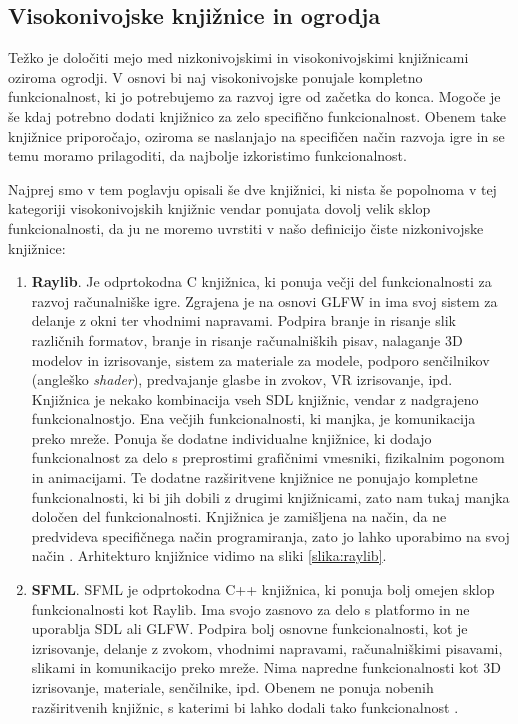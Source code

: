 \documentclass[12pt,a4paper,twoside]{book}
\begin{document}
\subsection{Visokonivojske knjižnice in ogrodja}
Težko je določiti mejo med nizkonivojskimi in visokonivojskimi knjižnicami oziroma ogrodji. V osnovi bi naj visokonivojske ponujale kompletno funkcionalnost, ki jo potrebujemo za razvoj igre od začetka do konca. Mogoče je še kdaj potrebno dodati knjižnico za zelo specifično funkcionalnost. Obenem take knjižnice priporočajo, oziroma se naslanjajo na specifičen način razvoja igre in se temu moramo prilagoditi, da najbolje izkoristimo funkcionalnost. 

Najprej smo v tem poglavju opisali še dve knjižnici, ki nista še popolnoma v tej kategoriji visokonivojskih knjižnic vendar ponujata dovolj velik sklop funkcionalnosti, da ju ne moremo uvrstiti v našo definicijo čiste nizkonivojske knjižnice:
\begin{enumerate}
	\item \textbf{Raylib}. Je odprtokodna C knjižnica, ki ponuja večji del funkcionalnosti za razvoj računalniške igre. Zgrajena je na osnovi GLFW in ima svoj sistem za delanje z okni ter vhodnimi napravami. Podpira branje in risanje slik različnih formatov, branje in risanje računalniških pisav, nalaganje 3D modelov in izrisovanje, sistem za materiale za modele, podporo senčilnikov (angleško \textit{shader}), predvajanje glasbe in zvokov, VR izrisovanje, ipd. Knjižnica je nekako kombinacija vseh SDL knjižnic, vendar z nadgrajeno funkcionalnostjo. Ena večjih funkcionalnosti, ki manjka, je komunikacija preko mreže. Ponuja še dodatne individualne knjižnice, ki dodajo funkcionalnost za delo s preprostimi grafičnimi vmesniki, fizikalnim pogonom in animacijami. Te dodatne razširitvene knjižnice ne ponujajo kompletne funkcionalnosti, ki bi jih dobili z drugimi knjižnicami, zato nam tukaj manjka določen del funkcionalnosti. Knjižnica je zamišljena na način, da ne predvideva specifičnega način programiranja, zato jo lahko uporabimo na svoj način \cite{raylib}. Arhitekturo knjižnice vidimo na sliki \ref{slika:raylib}.
	\item \textbf{SFML}. SFML je odprtokodna C++ knjižnica, ki ponuja bolj omejen sklop funkcionalnosti kot Raylib. Ima svojo zasnovo za delo s platformo in ne uporablja SDL ali GLFW. Podpira bolj osnovne funkcionalnosti, kot je izrisovanje, delanje z zvokom, vhodnimi napravami, računalniškimi pisavami, slikami in komunikacijo preko mreže. Nima napredne funkcionalnosti kot 3D izrisovanje, materiale, senčilnike, ipd. Obenem ne ponuja nobenih razširitvenih knjižnic, s katerimi bi lahko dodali tako funkcionalnost \cite{sfml}. 
\end{enumerate}
\end{document}

